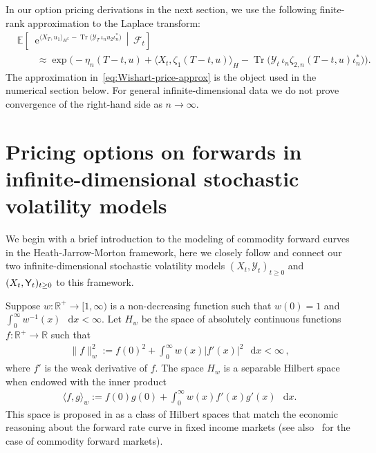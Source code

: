 \documentclass[10pt,a4paper,reqno]{amsart}
\newcommand*\D{\mathop{}\!\mathrm{d}}
\newcommand*\E{\mathop{}\!\mathrm{e}}
\DeclareMathOperator{\tr}{Tr}
\numberwithin{equation}{section}
\theoremstyle{plain}
\theoremstyle{definition}
\theoremstyle{example}
\renewcommand{\MR}{\mathbb{R}}
\newcommand{\R}{\MR}
\newcommand{\cY}{\mathcal{Y}}
\newcommand{\norm}[1]{\|#1\|}
\begin{document}
In our option pricing derivations in the next section, we use the following finite-rank approximation to the Laplace transform:
\begin{align}\label{eq:Wishart-price-approx}
&\mathbb{E}\left[
    \E^{\langle X_{T}, u_{1} \rangle_{H^\mathbb{C}} - \tr\big( \cY_{T} \, \iota_n u_{2} \iota_n^* \big)}
    \,\middle|\, \mathcal{F}_t
\right] \nonumber\\
&\qquad\approx
\exp\Big(
    - \eta_n(T-t, u)
    + \langle X_t, \zeta_{1}(T-t, u) \rangle_{H}
    - \tr\big( \cY_t \, \iota_n \zeta_{2,n}(T-t, u) \iota_n^* \big)
\Big).
\end{align}
The approximation in~\eqref{eq:Wishart-price-approx} is the object used in the numerical section below. For general infinite-dimensional data we do not prove convergence of the right-hand side as $n\to\infty$. 

\section{Pricing options on forwards in infinite-dimensional stochastic volatility models}\label{sec:appl-math-finance}

We begin with a brief introduction to the modeling of commodity forward
curves in the Heath-Jarrow-Morton framework, here we closely follow
\cite{BK14} and connect our two infinite-dimensional stochastic volatility models $(X_t, \cY_t)_{t\geq 0}$ and $(X_t, {\sf Y}_t)_{t\geq 0}$ to this framework.\par

Suppose $w\colon \R^+ \rightarrow  [1, \infty)$ is a non-decreasing function such that $w(0) = 1$ and $\int_{0}^{\infty}w^{-1}(x)\,\D
 x<\infty$. Let $H_w$ be the space of
absolutely continuous functions $f: \R^+\rightarrow \R$ such that  
 \begin{align*}
  \norm{f}_{w}^{2}:=f(0)^{2}+\int_{0}^{\infty}w(x)|f'(x)|^{2}\,\D x < \infty\,,
\end{align*}
where $f'$ is the weak derivative of $f$. The space $H_w$ is a separable Hilbert space when endowed with the inner product 
\begin{align*}
 \langle f,g\rangle_w := f(0)g(0) +\int_{0}^{\infty}w(x)f'(x)g'(x)\,\D x.
\end{align*}
This space is proposed in \cite{Fil01} as a class of Hilbert spaces that match the economic reasoning about the forward rate curve in fixed income markets (see also~\cite{BK14} for the case of commodity forward markets).
\end{document}
